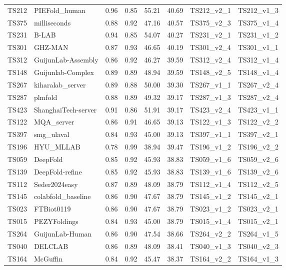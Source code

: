 \begin{longtable}{llllllll}
TS212 & PIEFold\_human & 0.96 & 0.85 & 55.21 & 40.69 & TS212\_v2\_1 & TS212\_v1\_3 \\ 
TS375 & milliseconds & 0.88 & 0.92 & 47.16 & 40.57 & TS375\_v2\_3 & TS375\_v1\_4 \\ 
TS231 & B-LAB & 0.94 & 0.85 & 54.07 & 40.27 & TS231\_v2\_1 & TS231\_v1\_2 \\ 
TS301 & GHZ-MAN & 0.87 & 0.93 & 46.65 & 40.19 & TS301\_v2\_4 & TS301\_v1\_1 \\ 
TS312 & GuijunLab-Assembly & 0.86 & 0.92 & 46.27 & 39.59 & TS312\_v2\_4 & TS312\_v1\_4 \\ 
TS148 & Guijunlab-Complex & 0.89 & 0.89 & 48.94 & 39.59 & TS148\_v2\_5 & TS148\_v1\_4 \\ 
TS267 & kiharalab\_server & 0.89 & 0.88 & 50.00 & 39.30 & TS267\_v1\_1 & TS267\_v2\_4 \\ 
TS287 & plmfold & 0.88 & 0.89 & 49.32 & 39.17 & TS287\_v1\_3 & TS287\_v2\_4 \\ 
TS423 & ShanghaiTech-server & 0.91 & 0.86 & 51.91 & 39.17 & TS423\_v2\_4 & TS423\_v1\_1 \\ 
TS122 & MQA\_server & 0.86 & 0.91 & 46.65 & 39.13 & TS122\_v1\_3 & TS122\_v2\_2 \\ 
TS397 & smg\_ulaval & 0.84 & 0.93 & 45.00 & 39.13 & TS397\_v1\_1 & TS397\_v2\_1 \\ 
TS196 & HYU\_MLLAB & 0.78 & 0.99 & 38.94 & 39.47 & TS196\_v1\_2 & TS196\_v2\_2 \\ 
TS059 & DeepFold & 0.85 & 0.92 & 45.93 & 38.83 & TS059\_v1\_6 & TS059\_v2\_6 \\ 
TS139 & DeepFold-refine & 0.85 & 0.92 & 45.93 & 38.83 & TS139\_v1\_6 & TS139\_v2\_6 \\ 
TS112 & Seder2024easy & 0.87 & 0.89 & 48.09 & 38.79 & TS112\_v1\_4 & TS112\_v2\_5 \\ 
TS145 & colabfold\_baseline & 0.86 & 0.90 & 47.67 & 38.79 & TS145\_v1\_2 & TS145\_v2\_1 \\ 
TS023 & FTBiot0119 & 0.86 & 0.90 & 47.67 & 38.79 & TS023\_v1\_2 & TS023\_v2\_1 \\ 
TS015 & PEZYFoldings & 0.84 & 0.93 & 45.00 & 38.79 & TS015\_v1\_4 & TS015\_v2\_1 \\ 
TS264 & GuijunLab-Human & 0.86 & 0.90 & 47.54 & 38.66 & TS264\_v2\_2 & TS264\_v1\_5 \\ 
TS040 & DELCLAB & 0.86 & 0.89 & 48.09 & 38.41 & TS040\_v1\_3 & TS040\_v2\_3 \\ 
TS164 & McGuffin & 0.84 & 0.92 & 45.47 & 38.37 & TS164\_v2\_2 & TS164\_v1\_3 \\ 

\end{longtable}
